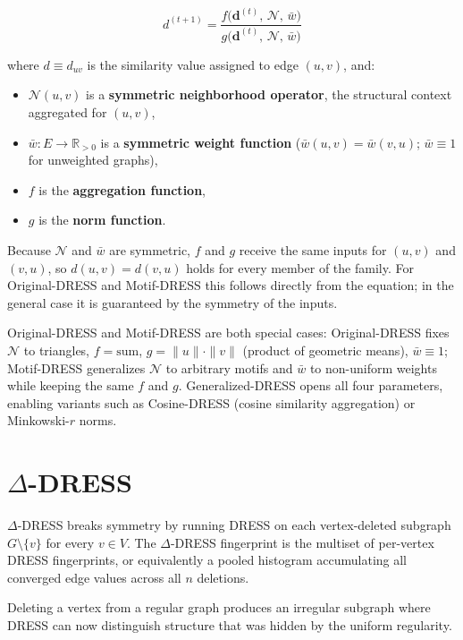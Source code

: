 \documentclass[11pt,a4paper]{article}
\begin{document}
\begin{equation}
d^{(t+1)} = \frac{f\bigl(\mathbf{d}^{(t)},\, \mathcal{N},\, \bar{w}\bigr)}{g\bigl(\mathbf{d}^{(t)},\, \mathcal{N},\, \bar{w}\bigr)}
\end{equation}

where $d \equiv d_{uv}$ is the similarity value assigned to edge $(u,v)$, and:
\begin{itemize}
    \item $\mathcal{N}(u,v)$ is a \textbf{symmetric neighborhood operator}, the structural context aggregated for $(u,v)$,
    \item $\bar{w}: E \to \mathbb{R}_{>0}$ is a \textbf{symmetric weight function} ($\bar{w}(u,v) = \bar{w}(v,u)$; $\bar{w} \equiv 1$ for unweighted graphs),
    \item $f$ is the \textbf{aggregation function},
    \item $g$ is the \textbf{norm function}.
\end{itemize}

Because $\mathcal{N}$ and $\bar{w}$ are symmetric, $f$ and $g$ receive the same inputs for $(u,v)$ and $(v,u)$, so $d(u,v) = d(v,u)$ holds for every member of the family. For Original-DRESS and Motif-DRESS this follows directly from the equation; in the general case it is guaranteed by the symmetry of the inputs.

Original-DRESS and Motif-DRESS are both special cases: Original-DRESS fixes $\mathcal{N}$ to triangles, $f = \text{sum}$, $g = \|u\| \cdot \|v\|$ (product of geometric means), $\bar{w} \equiv 1$; Motif-DRESS generalizes $\mathcal{N}$ to arbitrary motifs and $\bar{w}$ to non-uniform weights while keeping the same $f$ and $g$. Generalized-DRESS opens all four parameters, enabling variants such as Cosine-DRESS (cosine similarity aggregation) or Minkowski-$r$ norms.

\section{$\Delta$-DRESS}
$\Delta$-DRESS breaks symmetry by running DRESS on each vertex-deleted subgraph $G \setminus \{v\}$ for every $v \in V$. The $\Delta$-DRESS fingerprint is the multiset of per-vertex DRESS fingerprints, or equivalently a pooled histogram accumulating all converged edge values across all $n$ deletions.

Deleting a vertex from a regular graph produces an irregular subgraph where DRESS can now distinguish structure that was hidden by the uniform regularity.
\end{document}
